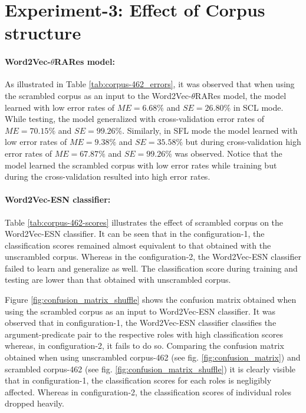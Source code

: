 \section{Experiment-3: Effect of Corpus structure} 

\paragraph{Word2Vec-$\theta$RARes model:}As illustrated in Table \ref{tab:corpus-462_errors}, it was observed that when using the scrambled corpus as an input to the Word2Vec-$\theta$RARes model, the model learned with low error rates of $ME = 6.68 \%$ and $SE = 26.80 \%$ in SCL mode. While testing, the model generalized with cross-validation error rates of $ME = 70.15 \% $ and $SE = 99.26 \%$. Similarly, in SFL mode the model learned with low error rates of $ME = 9.38 \%$ and $SE = 35.58 \%$  but during cross-validation high error rates of $ME = 67.87 \%$ and $SE = 99.26 \% $ was observed. Notice that the model learned the scrambled corpus with low error rates while training but during the cross-validation resulted into high error rates.

\paragraph{Word2Vec-ESN classifier:} Table \ref{tab:corpus-462-scores} illustrates the effect of scrambled corpus on the Word2Vec-ESN classifier. It can be seen that in the configuration-1, the classification scores remained almost equivalent to that obtained with the unscrambled corpus. Whereas in the configuration-2, the Word2Vec-ESN classifier failed to learn and generalize as well. The classification score during training and testing are lower than that obtained with unscrambled corpus. 

Figure \ref{fig:confusion_matrix_shuffle} shows the confusion matrix obtained when using the scrambled corpus as an input to Word2Vec-ESN classifier. It was observed that in configuration-1, the Word2Vec-ESN classifier classifies the argument-predicate pair to the respective roles with high classification scores whereas, in configuration-2, it fails to do so. Comparing the confusion matrix obtained when using unscrambled corpus-462 (see fig. \ref{fig:confusion_matrix}) and scrambled corpus-462 (see fig. \ref{fig:confusion_matrix_shuffle}) it is clearly visible that in configuration-1, the classification scores for each roles is negligibly affected. Whereas in configuration-2, the classification scores of individual roles dropped heavily.

